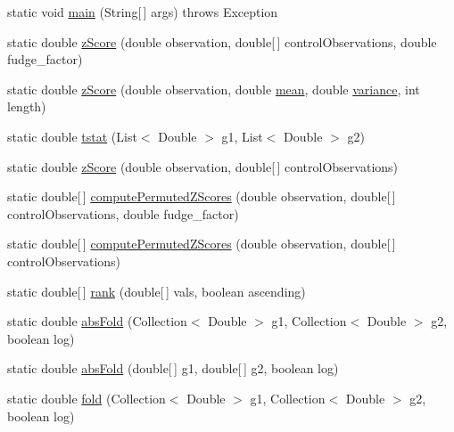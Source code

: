 \begin{DoxyCompactItemize}
static void \hyperlink{classbroad_1_1core_1_1math_1_1_statistics_a580590df3a1dd3da73120dee1baa88e6}{main} (String\mbox{[}$\,$\mbox{]} args)  throws Exception 
\item 
static double \hyperlink{classbroad_1_1core_1_1math_1_1_statistics_a7727015f44a0d0af58641b6cf0f135bd}{z\+Score} (double observation, double\mbox{[}$\,$\mbox{]} control\+Observations, double fudge\+\_\+factor)
\item 
static double \hyperlink{classbroad_1_1core_1_1math_1_1_statistics_a0c8c9e49aa63cfcccca07e0159894969}{z\+Score} (double observation, double \hyperlink{classbroad_1_1core_1_1math_1_1_statistics_a6cee05563e8d7390baaf1248fddc8596}{mean}, double \hyperlink{classbroad_1_1core_1_1math_1_1_statistics_a99743455771861e891a42d5e82eca0ff}{variance}, int length)
\item 
static double \hyperlink{classbroad_1_1core_1_1math_1_1_statistics_abb3dbdf78c89794885153984d31f5bb0}{tstat} (List$<$ Double $>$ g1, List$<$ Double $>$ g2)
\item 
static double \hyperlink{classbroad_1_1core_1_1math_1_1_statistics_adad3f85f957a335f895bff200b2ba4d2}{z\+Score} (double observation, double\mbox{[}$\,$\mbox{]} control\+Observations)
\item 
static double\mbox{[}$\,$\mbox{]} \hyperlink{classbroad_1_1core_1_1math_1_1_statistics_a1b6c59d31a5f6102d779c99d737a0d81}{compute\+Permuted\+Z\+Scores} (double observation, double\mbox{[}$\,$\mbox{]} control\+Observations, double fudge\+\_\+factor)
\item 
static double\mbox{[}$\,$\mbox{]} \hyperlink{classbroad_1_1core_1_1math_1_1_statistics_ac3e60046522ef28fae9711b568fa474e}{compute\+Permuted\+Z\+Scores} (double observation, double\mbox{[}$\,$\mbox{]} control\+Observations)
\item 
static double\mbox{[}$\,$\mbox{]} \hyperlink{classbroad_1_1core_1_1math_1_1_statistics_a01faa7d00604b601e5c9e5dc7af6e203}{rank} (double\mbox{[}$\,$\mbox{]} vals, boolean ascending)
\item 
static double \hyperlink{classbroad_1_1core_1_1math_1_1_statistics_a1e5445975568a1bdd3b314910c424a3e}{abs\+Fold} (Collection$<$ Double $>$ g1, Collection$<$ Double $>$ g2, boolean log)
\item 
static double \hyperlink{classbroad_1_1core_1_1math_1_1_statistics_a499cf82cd1856d5b06c4001ecf241f13}{abs\+Fold} (double\mbox{[}$\,$\mbox{]} g1, double\mbox{[}$\,$\mbox{]} g2, boolean log)
\item 
static double \hyperlink{classbroad_1_1core_1_1math_1_1_statistics_ac54645281ed6b8aa191f2d82255426bf}{fold} (Collection$<$ Double $>$ g1, Collection$<$ Double $>$ g2, boolean log)

\end{DoxyCompactItemize}
